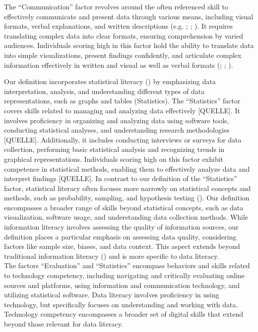 \documentclass[
  12pt,
  a4paper,
  twoside]{article}
\begin{document}
The ``Communication'' factor revolves around the often referenced skill to effectively communicate and present data through various means, including visual formats, verbal explanations, and written descriptions (e.g. ; ; ).
It requires translating complex data into clear formats, ensuring comprehension by varied audiences. Individuals scoring high in this factor hold the ability to translate data into simple visualizations, present findings confidently, and articulate complex information effectively in written and visual as well as verbal formats (; ; ).

Our definition incorporates statistical literacy () by emphasizing data interpretation, analysis, and understanding different types of data representations, such as graphs and tables (Statistics).
The ``Statistics'' factor covers skills related to managing and analyzing data effectively {[}QUELLE{]}. It involves proficiency in organizing and analyzing data using software tools, conducting statistical analyses, and understanding research methodologies {[}QUELLE{]}. Additionally, it includes conducting interviews or surveys for data collection, performing basic statistical analysis and recognizing trends in graphical representations. Individuals scoring high on this factor exhibit competence in statistical methods, enabling them to effectively analyze data and interpret findings {[}QUELLE{]}. In contrast to our definition of the ``Statistics'' factor, statistical literacy often focuses more narrowly on statistical concepts and methods, such as probability, sampling, and hypothesis testing (). Our definition encompasses a broader range of skills beyond statistical concepts, such as data visualization, software usage, and understanding data collection methods. While information literacy involves assessing the quality of information sources, our definition places a particular emphasis on assessing data quality, considering factors like sample size, biases, and data context. This aspect extends beyond traditional information literacy () and is more specific to data literacy.\\
The factors ``Evaluation'' and ``Statistics'' encompass behaviors and skills related to technology competency, including navigating and critically evaluating online sources and platforms, using information and communication technology, and utilizing statistical software. Data literacy involves proficiency in using technology, but specifically focuses on understanding and working with data. Technology competency encompasses a broader set of digital skills that extend beyond those relevant for data literacy.
\end{document}
